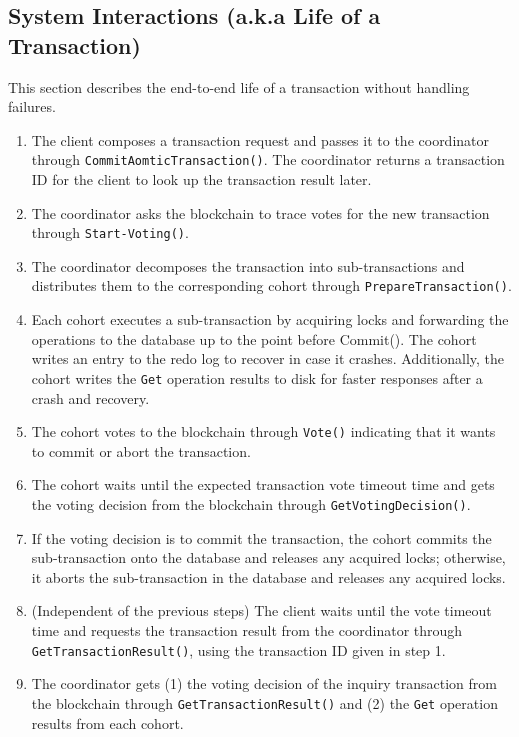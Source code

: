 \documentclass[11pt,sigplan,screen,nonacm]{acmart}
\begin{document}
\subsection{System Interactions (a.k.a Life of a Transaction)} \label{txnflow}

This section describes the end-to-end life of a transaction without handling failures.

\begin{enumerate}
  \item The client composes a transaction request and passes it to the coordinator through \texttt{CommitAomticTransaction()}. The coordinator returns a transaction ID for the client to look up the transaction result later.
  \item The coordinator asks the blockchain to trace votes for the new transaction through \texttt{Start-Voting()}.
  \item The coordinator decomposes the transaction into sub-transactions and distributes them to the corresponding cohort through \texttt{PrepareTransaction()}.
  \item Each cohort executes a sub-transaction by acquiring locks and forwarding the operations to the database up to the point before Commit(). The cohort writes an entry to the redo log to recover in case it crashes. Additionally, the cohort writes the \texttt{Get} operation results to disk for faster responses after a crash and recovery.
  \item The cohort votes to the blockchain through \texttt{Vote()} indicating that it wants to commit or abort the transaction.
  \item The cohort waits until the expected transaction vote timeout time and gets the voting decision from the blockchain through \texttt{GetVotingDecision()}.
  \item If the voting decision is to commit the transaction, the cohort commits the sub-transaction onto the database and releases any acquired locks; otherwise, it aborts the sub-transaction in the database and releases any acquired locks.
  \item (Independent of the previous steps) The client waits until the vote timeout time and requests the transaction result from the coordinator through \texttt{GetTransactionResult()}, using the transaction ID given in step 1.
  \item The coordinator gets (1) the voting decision of the inquiry transaction from the blockchain through \texttt{GetTransactionResult()} and (2) the \texttt{Get} operation results from each cohort.
\end{enumerate}
\end{document}
